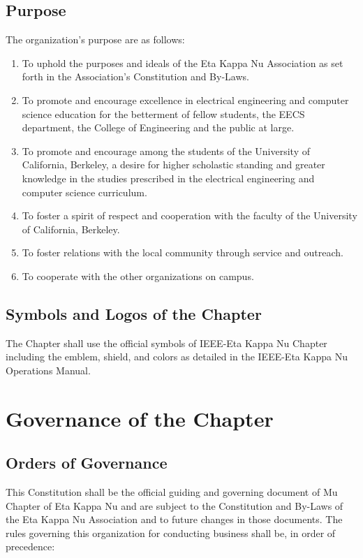 \documentclass[11pt]{article}
\begin{document}
\subsection{Purpose}
\label{sec:org396c10f}

The organization’s purpose are as follows:

\begin{enumerate}
\item To uphold the purposes and ideals of the Eta Kappa Nu Association as set forth in the Association’s Constitution and By-Laws.
\item To promote and encourage excellence in electrical engineering and computer science education for the betterment of fellow students, the EECS department, the College of Engineering and the public at large.
\item To promote and encourage among the students of the University of California, Berkeley, a desire for higher scholastic standing and greater knowledge in the studies prescribed in the electrical engineering and computer science curriculum.
\item To foster a spirit of respect and cooperation with the faculty of the University of California, Berkeley.
\item To foster relations with the local community through service and outreach.
\item To cooperate with the other organizations on campus.
\end{enumerate}

\subsection{Symbols and Logos of the Chapter}
\label{sec:org3d235f3}

The Chapter shall use the official symbols of IEEE-Eta Kappa Nu Chapter including the emblem, shield, and colors as detailed in the IEEE-Eta Kappa Nu Operations Manual.
\section{Governance of the Chapter}
\label{sec:orgc8a2228}

\subsection{Orders of Governance}
\label{sec:org730ac77}

This Constitution shall be the official guiding and governing document of Mu Chapter of Eta Kappa Nu and are subject to the Constitution and By-Laws of the Eta Kappa Nu Association and to future changes in those documents.
The rules governing this organization for conducting business shall be, in order of precedence:
\end{document}
